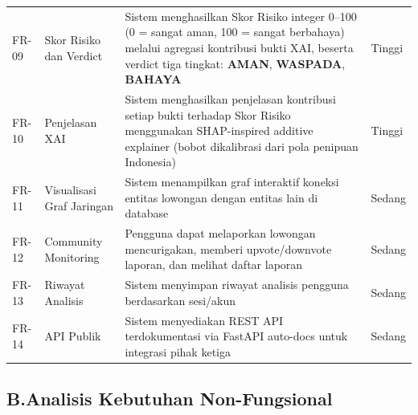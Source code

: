 \documentclass[12pt,a4paper]{article}
\begin{document}
\begin{xltabular}{\linewidth}{@{}L{1.3cm}L{3.0cm}YC{1.6cm}@{}}
FR-09 & Skor Risiko dan Verdict & Sistem menghasilkan Skor Risiko integer 0--100 (0 = sangat aman, 100 = sangat berbahaya) melalui agregasi kontribusi bukti XAI, beserta verdict tiga tingkat: \textbf{AMAN}, \textbf{WASPADA}, \textbf{BAHAYA} & Tinggi \\
FR-10 & Penjelasan XAI & Sistem menghasilkan penjelasan kontribusi setiap bukti terhadap Skor Risiko menggunakan SHAP-inspired additive explainer (bobot dikalibrasi dari pola penipuan Indonesia) & Tinggi \\
FR-11 & Visualisasi Graf Jaringan & Sistem menampilkan graf interaktif koneksi entitas lowongan dengan entitas lain di database & Sedang \\
FR-12 & Community Monitoring & Pengguna dapat melaporkan lowongan mencurigakan, memberi upvote/downvote laporan, dan melihat daftar laporan & Sedang \\
FR-13 & Riwayat Analisis & Sistem menyimpan riwayat analisis pengguna berdasarkan sesi/akun & Sedang \\
FR-14 & API Publik & Sistem menyediakan REST API terdokumentasi via FastAPI auto-docs untuk integrasi pihak ketiga & Sedang \\
\end{xltabular}
\endgroup

\subsection*{B.\quad Analisis Kebutuhan Non-Fungsional}
\end{document}
